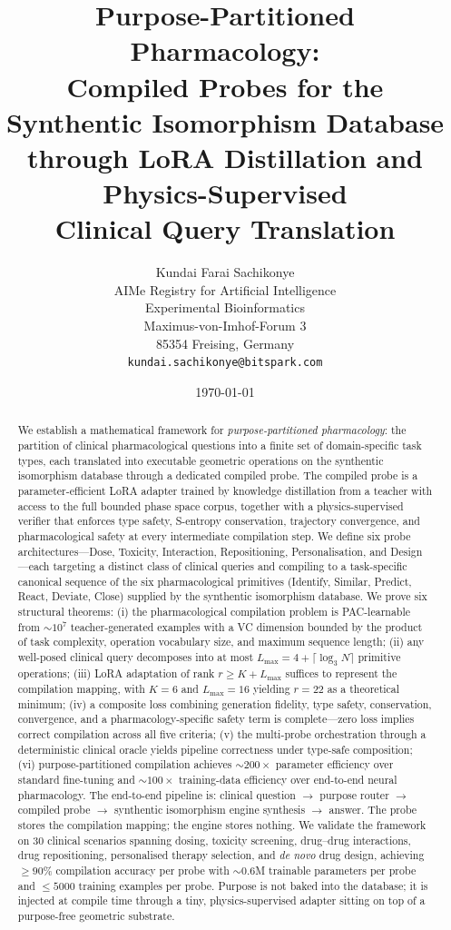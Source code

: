 \documentclass[11pt,twocolumn,a4paper]{article}
\title{\textbf{Purpose-Partitioned Pharmacology: \\
Compiled Probes for the Synthentic Isomorphism Database \\
through LoRA Distillation and Physics-Supervised \\
Clinical Query Translation}}
\author{
Kundai Farai Sachikonye\\[0.2em]
AIMe Registry for Artificial Intelligence\\[0.2em]
Experimental Bioinformatics\\[0.2em]
Maximus-von-Imhof-Forum 3\\[0.2em]
85354 Freising, Germany\\[0.2em]
\texttt{kundai.sachikonye@bitspark.com}
}
\date{\today}
\theoremstyle{definition}
\theoremstyle{remark}
\begin{document}
\maketitle

\begin{abstract}
We establish a mathematical framework for \emph{purpose-partitioned pharmacology}: the partition of clinical pharmacological questions into a finite set of domain-specific task types, each translated into executable geometric operations on the synthentic isomorphism database through a dedicated compiled probe. The compiled probe is a parameter-efficient LoRA adapter trained by knowledge distillation from a teacher with access to the full bounded phase space corpus, together with a physics-supervised verifier that enforces type safety, S-entropy conservation, trajectory convergence, and pharmacological safety at every intermediate compilation step. We define six probe architectures---Dose, Toxicity, Interaction, Repositioning, Personalisation, and Design---each targeting a distinct class of clinical queries and compiling to a task-specific canonical sequence of the six pharmacological primitives (Identify, Similar, Predict, React, Deviate, Close) supplied by the synthentic isomorphism database. We prove six structural theorems: (i) the pharmacological compilation problem is PAC-learnable from $\sim\!10^7$ teacher-generated examples with a VC dimension bounded by the product of task complexity, operation vocabulary size, and maximum sequence length; (ii) any well-posed clinical query decomposes into at most $L_{\max} = 4 + \lceil \log_3 N \rceil$ primitive operations; (iii) LoRA adaptation of rank $r \geq K + L_{\max}$ suffices to represent the compilation mapping, with $K = 6$ and $L_{\max} = 16$ yielding $r = 22$ as a theoretical minimum; (iv) a composite loss combining generation fidelity, type safety, conservation, convergence, and a pharmacology-specific safety term is complete---zero loss implies correct compilation across all five criteria; (v) the multi-probe orchestration through a deterministic clinical oracle yields pipeline correctness under type-safe composition; (vi) purpose-partitioned compilation achieves $\sim\!200\times$ parameter efficiency over standard fine-tuning and $\sim\!100\times$ training-data efficiency over end-to-end neural pharmacology. The end-to-end pipeline is: clinical question $\to$ purpose router $\to$ compiled probe $\to$ synthentic isomorphism engine synthesis $\to$ answer. The probe stores the compilation mapping; the engine stores nothing. We validate the framework on 30 clinical scenarios spanning dosing, toxicity screening, drug--drug interactions, drug repositioning, personalised therapy selection, and \emph{de novo} drug design, achieving $\geq 90\%$ compilation accuracy per probe with $\sim\!0.6$M trainable parameters per probe and $\leq 5000$ training examples per probe. Purpose is not baked into the database; it is injected at compile time through a tiny, physics-supervised adapter sitting on top of a purpose-free geometric substrate.


\end{abstract}
\end{document}
